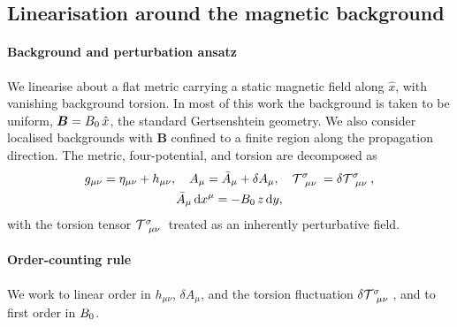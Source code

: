 
\subsection{Linearisation around the magnetic background}%
\label{Linearisation}

\paragraph*{Background and perturbation ansatz}
We linearise about a flat metric carrying a static magnetic field
along $\hat{x}$, with vanishing background torsion. In most of this
work the background is taken to be uniform,
$\boldsymbol{B} = B_0\,\hat{x}$, the standard Gertsenshtein geometry. We
also consider localised backgrounds with $\bm{B}$ confined to a
finite region along the propagation direction.
The metric, four-potential, and torsion are decomposed as
\begin{gather}
  g_{\mu\nu} = \eta_{\mu\nu} + h_{\mu\nu},
  \quad
  A_\mu = \bar{A}_\mu + \delta A_\mu,
  \quad
  \MAGT{^\sigma_\mu_\nu} = \delta\MAGT{^\sigma_\mu_\nu},
  \label{PerturbationAnsatz} \\
  \bar{A}_\mu\,\diff x^\mu = -\Bzero\,z\,\diff y, \label{BackgroundPotential}
\end{gather}
with the torsion tensor $\MAGT{^\sigma_\mu_\nu}$ treated as
an inherently perturbative field.

\paragraph*{Order-counting rule}
We work to linear order in $h_{\mu\nu}$, $\delta A_\mu$, and the
torsion fluctuation $\delta\MAGT{^\sigma_\mu_\nu}$, and to first
order in $B_0$.

